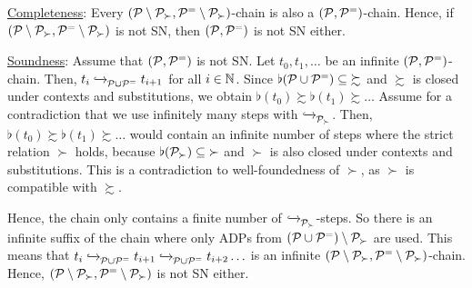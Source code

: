 \begin{myproof}
    \underline{Completeness}:
    Every $(\mathcal{P} \setminus \mathcal{P}_{\succ}, \mathcal{P}^{=} \setminus \mathcal{P}_{\succ})$-chain 
    is also a $(\mathcal{P},\mathcal{P}^{=})$-chain.
    Hence, if $(\mathcal{P} \setminus \mathcal{P}_{\succ}, \mathcal{P}^{=} \setminus \mathcal{P}_{\succ})$ is not SN, then
    $(\mathcal{P},\mathcal{P}^{=})$ is not SN either.

    \smallskip

    \noindent
    \underline{Soundness}:
    Assume that $(\mathcal{P},\mathcal{P}^{=})$ is not SN.
    Let $t_0, t_1, \ldots$ be an infinite $(\mathcal{P},\mathcal{P}^{=})$-chain.
    Then, $t_i \mathrel{ \xhookrightarrow{{}_{\scriptstyle }} \!\!{}^{}_{\mathcal{P} \cup \mathcal{P}^{=}} } t_{i+1}$ for all $i \in \mathbb{N}$.
    Since $\flat(\mathcal{P} \cup \mathcal{P}^{=}) \subseteq  {\succsim}$ and
    $\succsim$ is closed under contexts and substitutions, we obtain
     $\flat(t_0) \succsim \flat(t_1) \succsim \ldots$
    Assume for a contradiction that we use infinitely many steps with
$\mathrel{ \xhookrightarrow{{}_{\scriptstyle }} \!\!{}^{}_{\mathcal{P}_{\succ}} }$.
    Then, $\flat(t_0) \succsim \flat(t_1) \succsim \ldots$
 would contain an infinite number of steps where the
 strict relation $\succ$ holds, because 
$\flat(\mathcal{P}_{\succ}) \subseteq {\succ}$ and $\succ$  is also closed under contexts and
 substitutions. This
is a contradiction to well-foundedness of $\succ$, 
    as $\succ$ is compatible with $\succsim$.

  Hence, the chain only contains a finite number of $\mathrel{ \xhookrightarrow{{}_{\scriptstyle }} \!\!{}^{}_{\mathcal{P}_{\succ}} }$-steps. So there is an infinite suffix of the chain where only
  ADPs from
$(\mathcal{P} \cup \mathcal{P}^{=})\setminus \mathcal{P}_{\succ}$ are
  used.
      This means that $t_i \mathrel{ \xhookrightarrow{{}_{\scriptstyle }} \!\!{}^{}_{\mathcal{P} \cup \mathcal{P}^{=}} } t_{i+1} \mathrel{ \xhookrightarrow{{}_{\scriptstyle }} \!\!{}^{}_{\mathcal{P} \cup
        \mathcal{P}^{=}} } t_{i+2} \ldots$ is an infinite
      $(\mathcal{P} \setminus \mathcal{P}_{\succ}, \mathcal{P}^{=} \setminus \mathcal{P}_{\succ})$-chain.
Hence,
$(\mathcal{P} \setminus \mathcal{P}_{\succ}, \mathcal{P}^{=} \setminus \mathcal{P}_{\succ})$ is not SN either.
\end{myproof}
